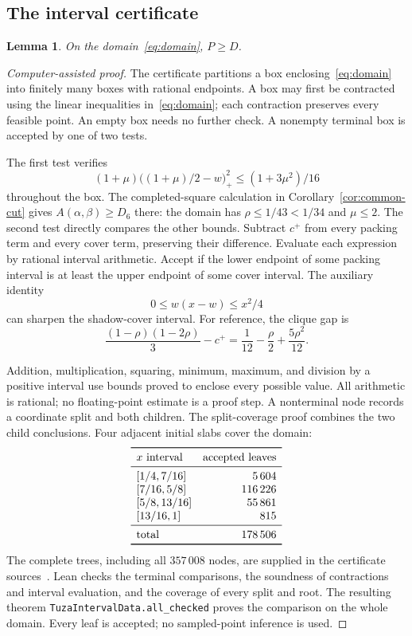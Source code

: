 \documentclass[11pt]{article}
\newtheorem{lemma}[theorem]{Lemma}
\begin{document}
\subsection{The interval certificate}
\begin{lemma}\label{lem:cyclic-interval}
On the domain~\eqref{eq:domain}, $P\geq D$.
\end{lemma}
\begin{proof}[Computer-assisted proof]
The certificate partitions a box enclosing~\eqref{eq:domain} into
finitely many boxes with rational endpoints. A box may first be
contracted using the linear inequalities in~\eqref{eq:domain}; each
contraction preserves every feasible point. An empty box needs no
further check. A nonempty terminal box is accepted by one of two tests.

The first test verifies
\[
 (1+\mu)\bigl((1+\mu)/2-w\bigr)_+^2
 \leq (1+3\mu^2)/16
\]
throughout the box. The completed-square calculation in
Corollary~\ref{cor:common-cut} gives $A(\alpha,\beta)\geq D_6$ there:
the domain has $\rho\leq1/43<1/34$ and $\mu\leq2$.
The second test directly compares the other bounds. Subtract $c^+$
from every packing term and every cover term, preserving their
difference. Evaluate each expression by rational interval arithmetic.
Accept if the lower endpoint of some packing interval is at least
the upper endpoint of some cover interval. The auxiliary identity
\[
 0\leq w(x-w)\leq x^2/4
\]
can sharpen the shadow-cover interval. For reference, the clique gap is
\[
 \frac{(1-\rho)(1-2\rho)}3-c^+
 =\frac1{12}-\frac\rho2+\frac{5\rho^2}{12}.
\]

Addition, multiplication, squaring, minimum, maximum, and division by
a positive interval use bounds proved to enclose every possible value.
All arithmetic is rational; no floating-point estimate is a proof step.
A nonterminal node records a coordinate split and both children.
The split-coverage proof combines the two child conclusions.
Four adjacent initial slabs cover the domain:
\[
\begin{array}{lr}
\toprule
x\text{ interval}&\text{accepted leaves}\\
\midrule
{[1/4,7/16]}&5\,604\\
{[7/16,5/8]}&116\,226\\
{[5/8,13/16]}&55\,861\\
{[13/16,1]}&815\\
\midrule
\text{total}&178\,506\\
\bottomrule
\end{array}
\]
The complete trees, including all $357\,008$ nodes, are supplied in
the certificate sources~\cite{artifact}. Lean checks the terminal
comparisons, the soundness of contractions and interval evaluation,
and the coverage of every split and root. The resulting theorem
\texttt{TuzaIntervalData.all\_checked} proves the comparison on the
whole domain. Every leaf is accepted; no sampled-point inference is used.
\end{proof}
\end{document}
